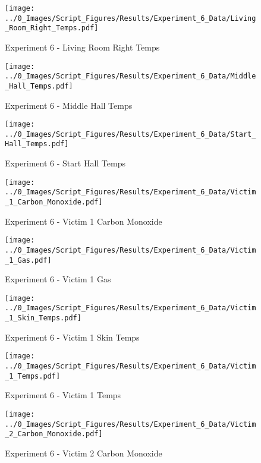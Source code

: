 	\begin{figure}[H]
		\centering
		\texttt{[image: ../0\_Images/Script\_Figures/Results/Experiment\_6\_Data/Living\_Room\_Right\_Temps.pdf]}
		\caption[]{Experiment 6 - Living Room Right Temps}
	\end{figure}
 
	\clearpage

	\begin{figure}[H]
		\centering
		\texttt{[image: ../0\_Images/Script\_Figures/Results/Experiment\_6\_Data/Middle\_Hall\_Temps.pdf]}
		\caption[]{Experiment 6 - Middle Hall Temps}
	\end{figure}
 

	\begin{figure}[H]
		\centering
		\texttt{[image: ../0\_Images/Script\_Figures/Results/Experiment\_6\_Data/Start\_Hall\_Temps.pdf]}
		\caption[]{Experiment 6 - Start Hall Temps}
	\end{figure}
 
	\clearpage

	\begin{figure}[H]
		\centering
		\texttt{[image: ../0\_Images/Script\_Figures/Results/Experiment\_6\_Data/Victim\_1\_Carbon\_Monoxide.pdf]}
		\caption[]{Experiment 6 - Victim 1 Carbon Monoxide}
	\end{figure}
 

	\begin{figure}[H]
		\centering
		\texttt{[image: ../0\_Images/Script\_Figures/Results/Experiment\_6\_Data/Victim\_1\_Gas.pdf]}
		\caption[]{Experiment 6 - Victim 1 Gas}
	\end{figure}
 
	\clearpage

	\begin{figure}[H]
		\centering
		\texttt{[image: ../0\_Images/Script\_Figures/Results/Experiment\_6\_Data/Victim\_1\_Skin\_Temps.pdf]}
		\caption[]{Experiment 6 - Victim 1 Skin Temps}
	\end{figure}
 

	\begin{figure}[H]
		\centering
		\texttt{[image: ../0\_Images/Script\_Figures/Results/Experiment\_6\_Data/Victim\_1\_Temps.pdf]}
		\caption[]{Experiment 6 - Victim 1 Temps}
	\end{figure}
 
	\clearpage

	\begin{figure}[H]
		\centering
		\texttt{[image: ../0\_Images/Script\_Figures/Results/Experiment\_6\_Data/Victim\_2\_Carbon\_Monoxide.pdf]}
		\caption[]{Experiment 6 - Victim 2 Carbon Monoxide}
	\end{figure}
 

